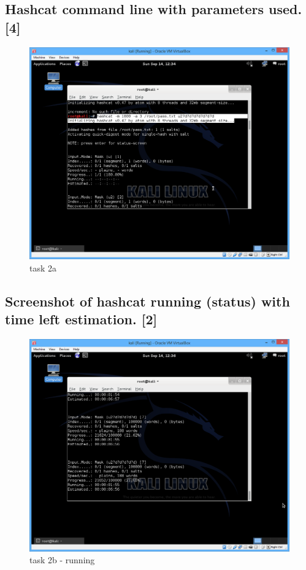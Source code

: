 \documentclass[11pt,titlepage]{article}
\begin{document}
\subsection{Hashcat command line with parameters used. [4]}
\begin{figure}[H]
\begin{center}
\includegraphics[scale=0.6]{task2a.png}
\caption{task 2a}
\end{center}
\end{figure}

\subsection{Screenshot of hashcat running (status) with time left estimation. [2]}
\begin{figure}[H]
\begin{center}
\includegraphics[scale=0.6]{task2b.png}
\caption{task 2b - running}
\end{center}
\end{figure}
\end{document}
